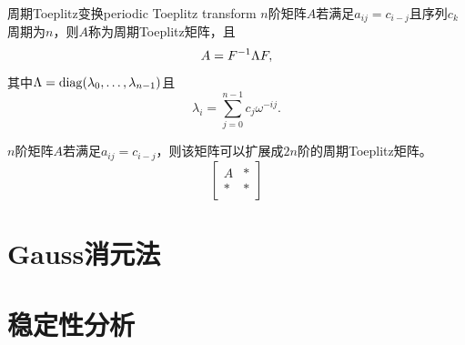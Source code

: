 \begin{theorem}
    {周期Toeplitz变换}{periodic Toeplitz transform}
    $n$阶矩阵$A$若满足$a_{ij}=c_{i-j}$且序列$c_k$周期为$n$，则$A$称为周期Toeplitz矩阵，且
    \begin{equation}
        A=F^{-1}\Lambda F,
    \end{equation}
    其中$\Lambda=\operatorname{diag}(\lambda_0,\ldots,\lambda_{n-1})$且
    \begin{equation}
        \lambda_i=\sum_{j=0}^{n-1}c_j\omega^{-ij}.
    \end{equation}
\end{theorem}

\begin{remark}
    $n$阶矩阵$A$若满足$a_{ij}=c_{i-j}$，则该矩阵可以扩展成$2n$阶的周期Toeplitz矩阵。
    \[
        \begin{bmatrix}
            A&*\\ *&*
        \end{bmatrix}
    \]
\end{remark}

\section{Gauss消元法}
\label{sec:Gauss elimination}

\section{稳定性分析}
\label{sec:stability analysis}

